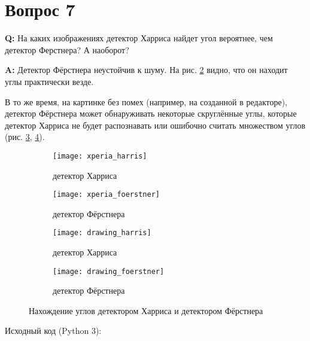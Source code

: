 \documentclass[a4paper,12pt]{article}
\newcommand{\myPictWidth}{.95\textwidth}
\begin{document}
\section{Вопрос 7}

\textbf{Q:} На каких изображениях детектор Харриса найдет угол вероятнее, чем детектор Ферстнера?
А наоборот?

\textbf{A:} Детектор Фёрстнера неустойчив к шуму.
На рис. \ref{fig:xperia_foerstner} видно, что он находит углы практически везде.

В то же время, на картинке без помех (например, на созданной в редакторе), детектор Фёрстнера может обнаруживать некоторые скруглённые углы, которые детектор Харриса не будет распознавать или ошибочно считать множеством углов (рис. \ref{fig:drawing_harris}, \ref{fig:drawing_foerstner}).

\begin{figure}[H]
    \centering
    \begin{subfigure}{.5\textwidth}
        \centering
        \texttt{[image: xperia\_harris]}
        \caption{детектор Харриса}
        \label{fig:xperia_harris}
    \end{subfigure}%
    \begin{subfigure}{.5\textwidth}
        \centering
        \texttt{[image: xperia\_foerstner]}
        \caption{детектор Фёрстнера}
        \label{fig:xperia_foerstner}
    \end{subfigure}

    \begin{subfigure}{.5\textwidth}
        \centering
        \texttt{[image: drawing\_harris]}
        \caption{детектор Харриса}
        \label{fig:drawing_harris}
    \end{subfigure}%
    \begin{subfigure}{.5\textwidth}
        \centering
        \texttt{[image: drawing\_foerstner]}
        \caption{детектор Фёрстнера}
        \label{fig:drawing_foerstner}
    \end{subfigure}
    \caption{Нахождение углов детектором Харриса и детектором Фёрстнера}
    \label{fig:1}
\end{figure}

Исходный код (Python 3):
\end{document}
